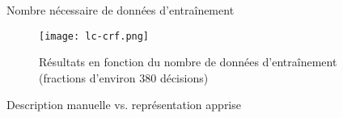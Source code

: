 \begin{frame}{Nombre nécessaire de données d'entraînement}
\begin{figure}[!h]
\texttt{[image: lc-crf.png]}
\caption{Résultats en fonction du nombre de données d'entraînement (fractions d'environ 380 décisions)}\label{p4_crf-learning-curves}
\end{figure}
\end{frame}

\begin{frame}{Description manuelle vs. représentation apprise}

\end{frame}
